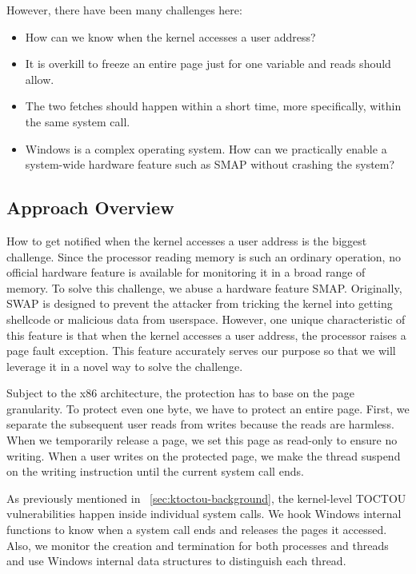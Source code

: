 However, there have been many challenges here:

\begin{itemize}
	\item How can we know when the kernel accesses a user address?
	\item It is overkill to freeze an entire page just for one variable and reads should allow.
	\item The two fetches should happen within a short time, more specifically, within the same system call.
	\item Windows is a complex operating system. How can we practically enable a system-wide hardware feature such as SMAP without crashing the system?
\end{itemize}



\subsection{Approach Overview}


How to get notified when the kernel accesses a user address is the biggest challenge. Since the processor reading memory is such an ordinary operation, no official hardware feature is available for monitoring it in a broad range of memory. To solve this challenge, we abuse a hardware feature SMAP.  Originally, SWAP is designed to prevent the attacker from tricking the kernel into getting shellcode or malicious data from userspace. However, one unique characteristic of this feature is that when the kernel accesses a user address, the processor raises a page fault exception. This feature accurately serves our purpose so that we will leverage it in a novel way to solve the challenge.

Subject to the x86 architecture, the protection has to base on the page granularity. To protect even one byte, we have to protect an entire page.
First, we separate the subsequent user reads from writes because the reads are harmless.  When we temporarily release a page, we set this page as read-only to ensure no writing. When a user writes on the protected page, we make the thread suspend on the writing instruction until the current system call ends.

As previously mentioned in ~\autoref{sec:ktoctou-background}, the kernel-level TOCTOU vulnerabilities happen inside individual system calls. We hook Windows internal functions to know when a system call ends and releases the pages it accessed. Also, we monitor the creation and termination for both processes and threads and use Windows internal data structures to distinguish each thread.

